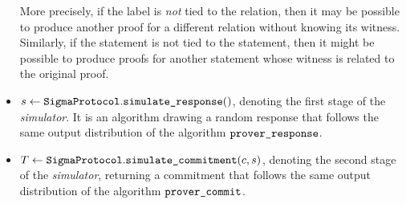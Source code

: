 \documentclass[11pt]{article}
\begin{document}
\begin{itemize}
          More precisely, if the label is \emph{not} tied to the relation, then it may be possible to produce another proof for a different relation without knowing its witness.
          Similarly, if the statement is not tied to the statement, then it might be possible to produce proofs
          for another statement whose witness is related to the original proof.

        \item $s \gets \texttt{SigmaProtocol}.\texttt{simulate\_response}()$,
        denoting the first stage of the \emph{simulator}. It is an algorithm drawing a random response that follows the same output distribution of the algorithm $\texttt{prover\_response}$.
        \item $T \gets \texttt{SigmaProtocol}.\texttt{simulate\_commitment}(c, s)$, denoting the second stage of the \emph{simulator}, returning a commitment that follows the same output distribution of the algorithm $\texttt{prover\_commit}$.
      \end{itemize}

\end{document}
